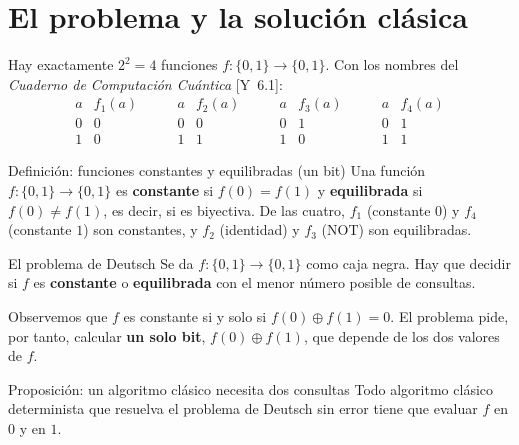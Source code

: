 \documentclass[11pt, a4paper, twoside, openright]{report}
\newcommand{\Yan}[1]{\textcolor{rosaviejo}{\small[Y~#1]}}  %
\begin{document}
\cleardoublepage
\section{El problema y la solución clásica}

\noindent Hay exactamente $2^2 = 4$ funciones $f : \{0,1\}\to\{0,1\}$. Con los nombres del \textit{Cuaderno de Computación Cuántica} \Yan{6.1}:
\[
\begin{array}{c|c} a & f_1(a) \\ \hline 0 & 0 \\ 1 & 0 \end{array}
\qquad
\begin{array}{c|c} a & f_2(a) \\ \hline 0 & 0 \\ 1 & 1 \end{array}
\qquad
\begin{array}{c|c} a & f_3(a) \\ \hline 0 & 1 \\ 1 & 0 \end{array}
\qquad
\begin{array}{c|c} a & f_4(a) \\ \hline 0 & 1 \\ 1 & 1 \end{array}
\]

\begin{teoria}{Definición: funciones constantes y equilibradas (un bit)}
Una función $f:\{0,1\}\to\{0,1\}$ es \textbf{constante} si $f(0) = f(1)$ y \textbf{equilibrada} si $f(0)\neq f(1)$, es decir, si es biyectiva. De las cuatro, $f_1$ (constante $0$) y $f_4$ (constante $1$) son constantes, y $f_2$ (identidad) y $f_3$ (NOT) son equilibradas.
\end{teoria}

\begin{teoria}{El problema de Deutsch}
Se da $f:\{0,1\}\to\{0,1\}$ como caja negra. Hay que decidir si $f$ es \textbf{constante} o \textbf{equilibrada} con el menor número posible de consultas.
\end{teoria}

\noindent Observemos que $f$ es constante si y solo si $f(0)\oplus f(1) = 0$. El problema pide, por tanto, calcular \textbf{un solo bit}, $f(0)\oplus f(1)$, que depende de los dos valores de $f$.

\begin{teoria}{Proposición: un algoritmo clásico necesita dos consultas}
Todo algoritmo clásico determinista que resuelva el problema de Deutsch sin error tiene que evaluar $f$ en $0$ y en $1$.
\end{teoria}
\end{document}
